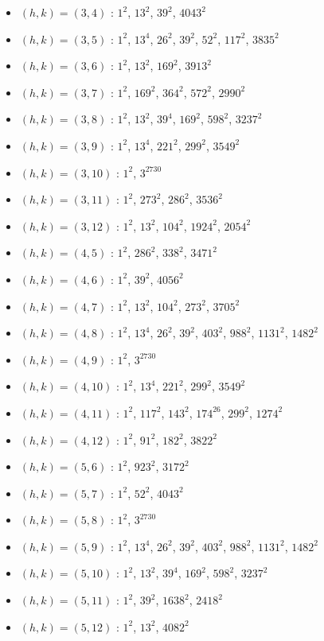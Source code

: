 \begin{itemize}
\item $(h,k)=(3,4)$ : $1^{2}$, $13^{2}$, $39^{2}$, $4043^{2}$
\item $(h,k)=(3,5)$ : $1^{2}$, $13^{4}$, $26^{2}$, $39^{2}$, $52^{2}$, $117^{2}$, $3835^{2}$
\item $(h,k)=(3,6)$ : $1^{2}$, $13^{2}$, $169^{2}$, $3913^{2}$
\item $(h,k)=(3,7)$ : $1^{2}$, $169^{2}$, $364^{2}$, $572^{2}$, $2990^{2}$
\item $(h,k)=(3,8)$ : $1^{2}$, $13^{2}$, $39^{4}$, $169^{2}$, $598^{2}$, $3237^{2}$
\item $(h,k)=(3,9)$ : $1^{2}$, $13^{4}$, $221^{2}$, $299^{2}$, $3549^{2}$
\item $(h,k)=(3,10)$ : $1^{2}$, $3^{2730}$
\item $(h,k)=(3,11)$ : $1^{2}$, $273^{2}$, $286^{2}$, $3536^{2}$
\item $(h,k)=(3,12)$ : $1^{2}$, $13^{2}$, $104^{2}$, $1924^{2}$, $2054^{2}$
\item $(h,k)=(4,5)$ : $1^{2}$, $286^{2}$, $338^{2}$, $3471^{2}$
\item $(h,k)=(4,6)$ : $1^{2}$, $39^{2}$, $4056^{2}$
\item $(h,k)=(4,7)$ : $1^{2}$, $13^{2}$, $104^{2}$, $273^{2}$, $3705^{2}$
\item $(h,k)=(4,8)$ : $1^{2}$, $13^{4}$, $26^{2}$, $39^{2}$, $403^{2}$, $988^{2}$, $1131^{2}$, $1482^{2}$
\item $(h,k)=(4,9)$ : $1^{2}$, $3^{2730}$
\item $(h,k)=(4,10)$ : $1^{2}$, $13^{4}$, $221^{2}$, $299^{2}$, $3549^{2}$
\item $(h,k)=(4,11)$ : $1^{2}$, $117^{2}$, $143^{2}$, $174^{26}$, $299^{2}$, $1274^{2}$
\item $(h,k)=(4,12)$ : $1^{2}$, $91^{2}$, $182^{2}$, $3822^{2}$
\item $(h,k)=(5,6)$ : $1^{2}$, $923^{2}$, $3172^{2}$
\item $(h,k)=(5,7)$ : $1^{2}$, $52^{2}$, $4043^{2}$
\item $(h,k)=(5,8)$ : $1^{2}$, $3^{2730}$
\item $(h,k)=(5,9)$ : $1^{2}$, $13^{4}$, $26^{2}$, $39^{2}$, $403^{2}$, $988^{2}$, $1131^{2}$, $1482^{2}$
\item $(h,k)=(5,10)$ : $1^{2}$, $13^{2}$, $39^{4}$, $169^{2}$, $598^{2}$, $3237^{2}$
\item $(h,k)=(5,11)$ : $1^{2}$, $39^{2}$, $1638^{2}$, $2418^{2}$
\item $(h,k)=(5,12)$ : $1^{2}$, $13^{2}$, $4082^{2}$

\end{itemize}
